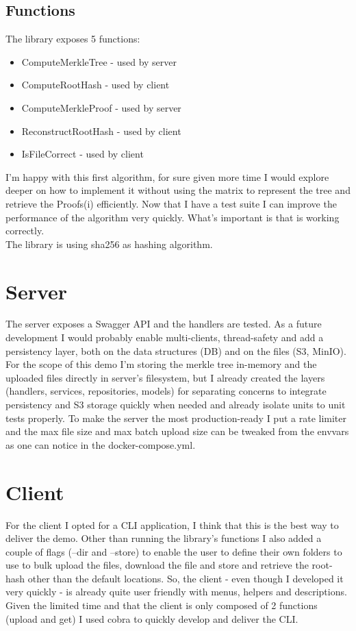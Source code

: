 \documentclass[11pt]{article}
\begin{document}
\subsection{Functions}
\label{sec:org0015e93}
The library exposes 5 functions:
\begin{itemize}
\item ComputeMerkleTree - used by server
\item ComputeRootHash - used by client
\item ComputeMerkleProof - used by server
\item ReconstructRootHash - used by client
\item IsFileCorrect - used by client
\end{itemize}
I'm happy with this first algorithm, for sure given more time I would explore deeper on how to implement it without using the matrix to represent the tree and retrieve the Proofs(i) efficiently. Now that I have a test suite I can improve the performance of the algorithm very quickly.
What's important is that is working correctly.\\[0pt]
The library is using sha256 as hashing algorithm.
\section{Server}
\label{sec:org3bc0eab}
The server exposes a Swagger API and the handlers are tested.
As a future development I would probably enable multi-clients, thread-safety and add a persistency layer, both on the data structures (DB) and on the files (S3, MinIO).
For the scope of this demo I'm storing the merkle tree in-memory and the uploaded files directly in server's filesystem, but I already created the layers (handlers, services, repositories, models) for separating concerns to integrate persistency and S3 storage quickly when needed and already isolate units to unit tests properly.
To make the server the most production-ready I put a rate limiter and the max file size and max batch upload size can be tweaked from the envvars as one can notice in the docker-compose.yml.
\section{Client}
\label{sec:org666c9f8}
For the client I opted for a CLI application, I think that this is the best way to deliver the demo.
Other than running the library's functions I also added a couple of flags (--dir and --store) to enable the user to define their own folders to use to bulk upload the files, download the file and store and retrieve the root-hash other than the default locations. So, the client - even though I developed it very quickly - is already quite user friendly with menus, helpers and descriptions.
Given the limited time and that the client is only composed of 2 functions (upload and get) I used cobra to quickly develop and deliver the CLI.
\end{document}
